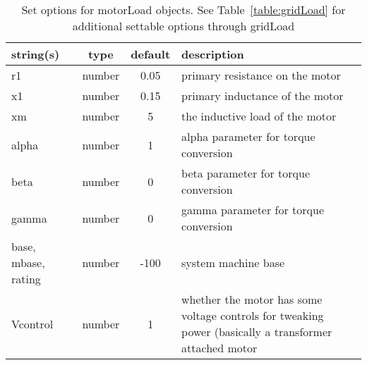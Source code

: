 \begin{table}[ht]
\centering
\begin{tabular}{p{5cm} c c p{7cm}}
\hline
string(s) & type & default & description \\
\hline
r1 & number & 0.05 & primary resistance on the motor\\
x1 & number & 0.15 & primary inductance of the motor\\
xm & number & 5 & the inductive load of the motor\\
alpha & number & 1 & alpha parameter for torque conversion\\
beta & number & 0 & beta parameter for torque conversion\\
gamma & number & 0 & gamma parameter for torque conversion\\
base, mbase, rating & number & -100 & system machine base\\
Vcontrol & number & 1 & whether the motor has some voltage controls for tweaking power (basically a transformer attached motor\\
\hline
\end{tabular}
\caption{Set options for motorLoad objects. See Table~\ref{table:gridLoad} for additional settable options through gridLoad}
\label{table:motorLoad}
\end{table}
